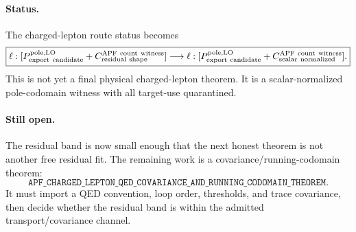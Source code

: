 \paragraph{Status.}
The charged-lepton route status becomes
\[
\boxed{
\ell:[P_{\rm export\ candidate}^{\rm pole,LO}+C_{\rm residual\ shape}^{\rm APF\ count\ witness}]
\longrightarrow
\ell:[P_{\rm export\ candidate}^{\rm pole,LO}+C_{\rm scalar\ normalized}^{\rm APF\ count\ witness}].
}
\]
This is not yet a final physical charged-lepton theorem.  It is a scalar-normalized pole-codomain witness with all target-use quarantined.

\paragraph{Still open.}
The residual band is now small enough that the next honest theorem is not another free residual fit.  The remaining work is a covariance/running-codomain theorem:
\[
\boxed{\texttt{APF\_CHARGED\_LEPTON\_QED\_COVARIANCE\_AND\_RUNNING\_CODOMAIN\_THEOREM}.}
\]
It must import a QED convention, loop order, thresholds, and trace covariance, then decide whether the residual band is within the admitted transport/covariance channel.
